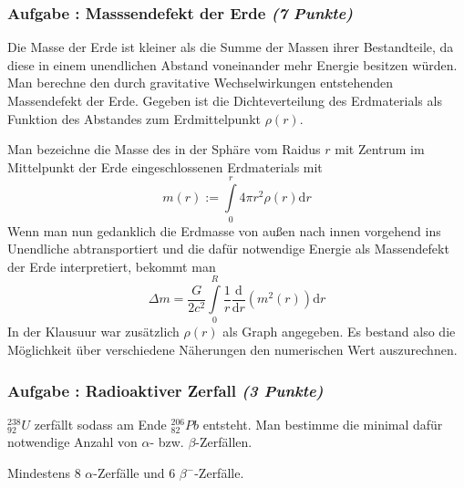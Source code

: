 \documentclass[12pt,a4paper]{article}
\newcommand{\dif}{\mathrm{d}}
\newcommand{\tdif}[2]{\frac{\dif#1}{\dif#2}}
\newcounter{numlabel}
\newenvironment{problem}[2]{\stepcounter{numlabel} \vspace{1ex} \subsubsection*{Aufgabe \the\value{numlabel}: #1 \emph{(#2 Punkte)}} \renewcommand{\Currentlabel}{Aufgabe \the\value{numlabel}: #1}}{

}
\begin{document}
\begin{problem}{Masssendefekt der Erde}{7}
Die Masse der Erde ist kleiner als die Summe der Massen ihrer Bestandteile, da diese in einem unendlichen Abstand voneinander mehr Energie besitzen würden. Man berechne den durch gravitative Wechselwirkungen entstehenden Massendefekt der Erde. Gegeben ist die Dichteverteilung des Erdmaterials als Funktion des Abstandes zum Erdmittelpunkt $\rho(r)$.

\begin{solution}
Man bezeichne die Masse des in der Sphäre vom Raidus $r$ mit Zentrum im Mittelpunkt der Erde eingeschlossenen Erdmaterials mit
\[
m(r) := \int\limits_0^r 4\pi r^2 \rho(r) \dif r
\]
Wenn man nun gedanklich die Erdmasse von außen nach innen vorgehend ins Unendliche abtransportiert und die dafür notwendige Energie als Massendefekt der Erde interpretiert, bekommt man
\[
\Delta m = \frac{G}{2 c^2} \int\limits_{0}^{R} \frac1r \tdif{}{r} \left( m^2(r) \right) \dif r
\]
In der Klausuur war zusätzlich $\rho(r)$ als Graph angegeben. Es bestand also die Möglichkeit über verschiedene Näherungen den numerischen Wert auszurechnen.
\end{solution}

\end{problem}
















\begin{problem}{Radioaktiver Zerfall}{3}
$_{92}^{238}U$ zerfällt sodass am Ende $_{82}^{206}Pb$ entsteht. Man bestimme die minimal dafür notwendige Anzahl von $\alpha$- bzw. $\beta$-Zerfällen.
\begin{solution}
Mindestens $8$ $\alpha$-Zerfälle und $6$ $\beta^-$-Zerfälle.
\end{solution}
\end{problem}
\end{document}
